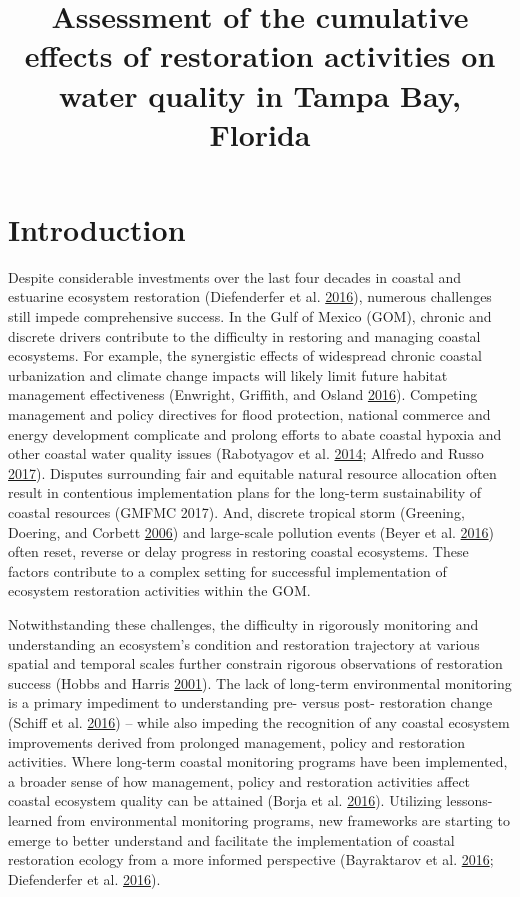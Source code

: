 \documentclass[]{article}
\title{Assessment of the cumulative effects of restoration activities on water
quality in Tampa Bay, Florida}
\author{}
\date{}
\begin{document}
\maketitle

\hypertarget{introduction}{%
\section{Introduction}\label{introduction}}

Despite considerable investments over the last four decades in coastal
and estuarine ecosystem restoration (Diefenderfer et al.
\protect\hyperlink{ref-Diefenderfer16}{2016}), numerous challenges still
impede comprehensive success. In the Gulf of Mexico (GOM), chronic and
discrete drivers contribute to the difficulty in restoring and managing
coastal ecosystems. For example, the synergistic effects of widespread
chronic coastal urbanization and climate change impacts will likely
limit future habitat management effectiveness (Enwright, Griffith, and
Osland \protect\hyperlink{ref-Enwright16}{2016}). Competing management
and policy directives for flood protection, national commerce and energy
development complicate and prolong efforts to abate coastal hypoxia and
other coastal water quality issues (Rabotyagov et al.
\protect\hyperlink{ref-Rabotyagov14}{2014}; Alfredo and Russo
\protect\hyperlink{ref-Alfredo17}{2017}). Disputes surrounding fair and
equitable natural resource allocation often result in contentious
implementation plans for the long-term sustainability of coastal
resources (GMFMC 2017). And, discrete tropical storm (Greening, Doering,
and Corbett \protect\hyperlink{ref-Greening06b}{2006}) and large-scale
pollution events (Beyer et al. \protect\hyperlink{ref-Beyer16}{2016})
often reset, reverse or delay progress in restoring coastal ecosystems.
These factors contribute to a complex setting for successful
implementation of ecosystem restoration activities within the GOM.

Notwithstanding these challenges, the difficulty in rigorously
monitoring and understanding an ecosystem's condition and restoration
trajectory at various spatial and temporal scales further constrain
rigorous observations of restoration success (Hobbs and Harris
\protect\hyperlink{ref-Hobbs01}{2001}). The lack of long-term
environmental monitoring is a primary impediment to understanding pre-
versus post- restoration change (Schiff et al.
\protect\hyperlink{ref-Schiff16}{2016}) -- while also impeding the
recognition of any coastal ecosystem improvements derived from prolonged
management, policy and restoration activities. Where long-term coastal
monitoring programs have been implemented, a broader sense of how
management, policy and restoration activities affect coastal ecosystem
quality can be attained (Borja et al.
\protect\hyperlink{ref-Borja16}{2016}). Utilizing lessons-learned from
environmental monitoring programs, new frameworks are starting to emerge
to better understand and facilitate the implementation of coastal
restoration ecology from a more informed perspective (Bayraktarov et al.
\protect\hyperlink{ref-Bayraktarov16}{2016}; Diefenderfer et al.
\protect\hyperlink{ref-Diefenderfer16}{2016}).
\end{document}
